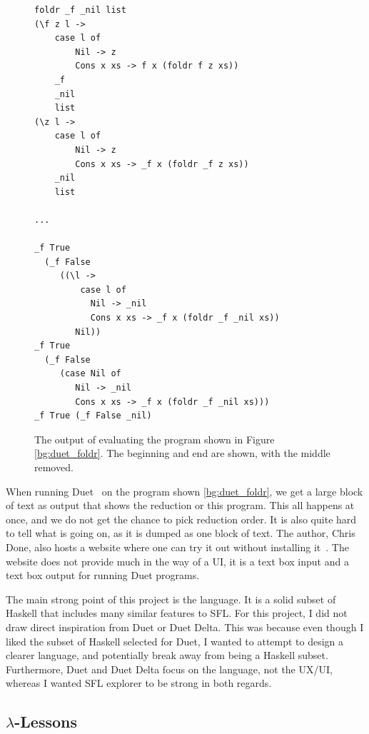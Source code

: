 \begin{figure}[h]
    \centering
    \begin{lstlisting}[language=SFL]
foldr _f _nil list
(\f z l ->
    case l of
        Nil -> z
        Cons x xs -> f x (foldr f z xs))
    _f
    _nil
    list
(\z l ->
    case l of
        Nil -> z
        Cons x xs -> _f x (foldr _f z xs))
    _nil
    list

... 

_f True
  (_f False
     ((\l ->
         case l of
           Nil -> _nil
           Cons x xs -> _f x (foldr _f _nil xs))
        Nil))
_f True
  (_f False
     (case Nil of
        Nil -> _nil
        Cons x xs -> _f x (foldr _f _nil xs)))
_f True (_f False _nil)
\end{lstlisting}

    \caption{The output of evaluating the program shown in Figure \ref{bg:duet_foldr}. The beginning and end are shown, with the middle removed. }
    \label{bg:duet_foldr_eval}
\end{figure}

\noindent When running Duet~\cite{duet_hackage} on the program shown \ref{bg:duet_foldr}, we get a large block of text as output that shows the reduction or this program. This all happens at once, and we do not get the chance to pick reduction order. It is also quite hard to tell what is going on, as it is dumped as one block of text. The author, Chris Done, also hosts a website where one can try it out without installing it~\cite{duet_delta}. The website does not provide much in the way of a UI, it is a text box input and a text box output for running Duet programs.

The main strong point of this project is the language. It is a solid subset of Haskell that includes many similar features to SFL. For this project, I did not draw direct inspiration from Duet or Duet Delta. This was because even though I liked the subset of Haskell selected for Duet, I wanted to attempt to design a clearer language, and potentially break away from being a Haskell subset. Furthermore, Duet and Duet Delta focus on the language, not the UX/UI, whereas I wanted SFL explorer to be strong in both regards. 

\subsection{$\lambda$-Lessons}
\newcommand{\llessons}{$\lambda$-Lessons}
\label{bg:llessons}

